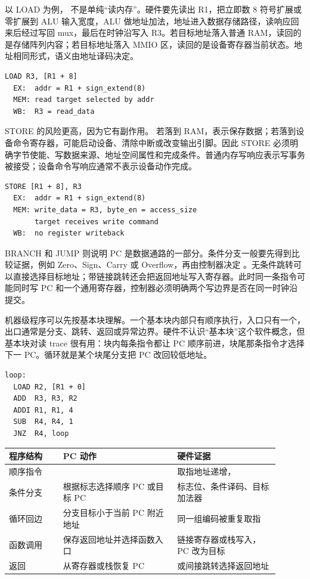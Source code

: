 以 LOAD 为例， 不是单纯“读内存”。硬件要先读出 R1，把立即数 8 符号扩展或零扩展到 ALU 输入宽度，ALU 做地址加法，地址进入数据存储路径，读响应回来后经过写回 mux，最后在时钟沿写入 R3。若目标地址落入普通 RAM，读回的是存储阵列内容；若目标地址落入 MMIO 区，读回的是设备寄存器当前状态。地址相同形式，语义由地址译码决定。

\begin{lstlisting}
LOAD R3, [R1 + 8]
  EX:  addr = R1 + sign_extend(8)
  MEM: read target selected by addr
  WB:  R3 = read_data
\end{lstlisting}

STORE 的风险更高，因为它有副作用。  若落到 RAM，表示保存数据；若落到设备命令寄存器，可能启动设备、清除中断或改变输出引脚。因此 STORE 必须明确字节使能、写数据来源、地址空间属性和完成条件。普通内存写响应表示写事务被接受；设备命令写响应通常不表示设备动作完成。

\begin{lstlisting}
STORE [R1 + 8], R3
  EX:  addr = R1 + sign_extend(8)
  MEM: write_data = R3, byte_en = access_size
       target receives write command
  WB:  no register writeback
\end{lstlisting}

BRANCH 和 JUMP 则说明 PC 是数据通路的一部分。条件分支一般要先得到比较证据，例如 Zero、Sign、Carry 或 Overflow，再由控制器决定 。无条件跳转可以直接选择目标地址；带链接跳转还会把返回地址写入寄存器。此时同一条指令可能同时写 PC 和一个通用寄存器，控制器必须明确两个写边界是否在同一时钟沿提交。

机器级程序可以先按基本块理解。一个基本块内部只有顺序执行，入口只有一个，出口通常是分支、跳转、返回或异常边界。硬件不认识“基本块”这个软件概念，但基本块对读 trace 很有用：块内每条指令都让 PC 顺序前进，块尾那条指令才选择下一 PC。循环就是某个块尾分支把 PC 改回较低地址。

\begin{lstlisting}
loop:
  LOAD R2, [R1 + 0]
  ADD  R3, R3, R2
  ADDI R1, R1, 4
  SUB  R4, R4, 1
  JNZ  R4, loop
\end{lstlisting}

\begin{longtable}{L{0.18\linewidth}L{0.38\linewidth}L{0.34\linewidth}}
\toprule
程序结构 & PC 动作 & 硬件证据 \\
\midrule
顺序指令 &  & 取指地址递增， \\
条件分支 & 根据标志选择顺序 PC 或目标 PC & 标志位、条件译码、目标加法器 \\
循环回边 & 分支目标小于当前 PC 附近地址 & 同一组编码被重复取指 \\
函数调用 & 保存返回地址并选择函数入口 & 链接寄存器或栈写入，PC 改为目标 \\
返回 & 从寄存器或栈恢复 PC &  或间接跳转选择返回地址 \\
\bottomrule
\end{longtable}

